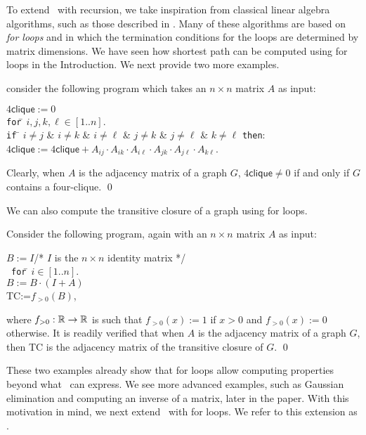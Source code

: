 To extend \lang\ with recursion, we take inspiration from classical linear algebra algorithms, such as those described in \cite{num}. Many of these algorithms are based on \textit{for loops} and in which the termination conditions for the loops are determined by matrix dimensions. We have seen how shortest path can be computed using for loops in the Introduction. We next provide two more examples.
\begin{example}consider the following program which takes
an $n\times n$ matrix $A$ as input:
\begin{tabbing}
$4\mathsf{clique}:=0$\\
\texttt{for}\=\,  $i,j,k,\ell\in[1..n]$. \\
\> \texttt{if} \= $i\neq j$ \& $i\neq k$ \& $i\neq \ell$ \& $j\neq k$ \& $j\neq \ell$ \& $k\neq\ell$ \texttt{then}:\\
\> \> $4\mathsf{clique}:= 4\mathsf{clique} + A_{ij}\cdot A_{ik}\cdot A_{i\ell} \cdot A_{jk}\cdot A_{j\ell} \cdot A_{k\ell}$.  
\end{tabbing}
Clearly, when $A$ is the adjacency matrix of a graph $G$, $4\mathsf{clique}\neq 0$ if and only if $G$ contains a four-clique. \qed
\end{example}
We can also compute the transitive closure of a graph using for loops.
\begin{example}\label{ex:programtc}
Consider the following program, again with an $n\times n$ matrix $A$ as input:
\begin{tabbing}
$B:=I$\quad /* $I$ is the $n\times n$ identity matrix */\\\	
\texttt{for}\=\,  $i\in[1..n]$.\\
\> $B:=B\cdot (I+A)$\quad \\
\textsf{TC}:=$f_{>0}(B)$,
\end{tabbing}
where $f_{>0}:\mathbb{R}\to\mathbb{R}$ is such that $f_{>0}(x):=1$ if $x>0$ and $f_{>0}(x):=0$ otherwise. It is readily verified that when $A$ is the adjacency matrix of a graph $G$, then \textsf{TC} is the adjacency matrix of the transitive closure of $G$. \qed
\end{example}
These two examples already show that for loops allow computing properties beyond what \lang\ can express.
We see more advanced examples, such as Gaussian elimination and computing an inverse of a matrix, later in the paper. 
With this motivation in mind, we next extend \lang\ with for loops. We refer to this extension as \langfor. 

